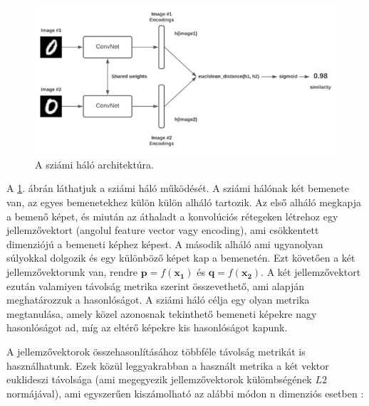 
\begin{figure}[ht]
	\centering
	\includegraphics[width=1\columnwidth]{figures/siamese.png}
	\caption{A sziámi háló architektúra.}
	\label{fig:siamese}
\end{figure}

A \ref{fig:siamese}. ábrán láthatjuk a sziámi háló működését. A sziámi hálónak két bemenete van, az egyes bemenetekhez külön külön alháló tartozik. Az első alháló megkapja a bemenő képet, és miután az áthaladt a konvolúciós rétegeken létrehoz egy jellemzővektort (angolul feature vector vagy encoding), ami csökkentett dimenziójú a bemeneti képhez képest. A második alháló ami ugyanolyan súlyokkal dolgozik és egy különböző képet kap a bemenetén. Ezt követően a két jellemzővektorunk van, rendre $\mathbf{p} = f(\mathbf{x_1})$ és $\mathbf{q} = f(\mathbf{x_2})$. A két jellemzővektort ezután valamiyen távolság metrika szerint összevethető, ami alapján meghatározzuk a hasonlóságot. A sziámi háló célja egy olyan metrika megtanulása, amely közel azonosnak tekinthető bemeneti képekre nagy hasonlóságot ad, míg az eltérő képekre kis hasonlóságot kapunk.

A jellemzővektorok összehasonlításához többféle távolság metrikát is használhatunk. Ezek közül leggyakrabban a használt metrika a két vektor euklideszi távolsága (ami megegyezik jellemzővektorok külömbségének $L2$ normájával), ami egyszerűen kiszámolható az alábbi módon n dimenziós esetben \cite{tabak2014geometry}:

